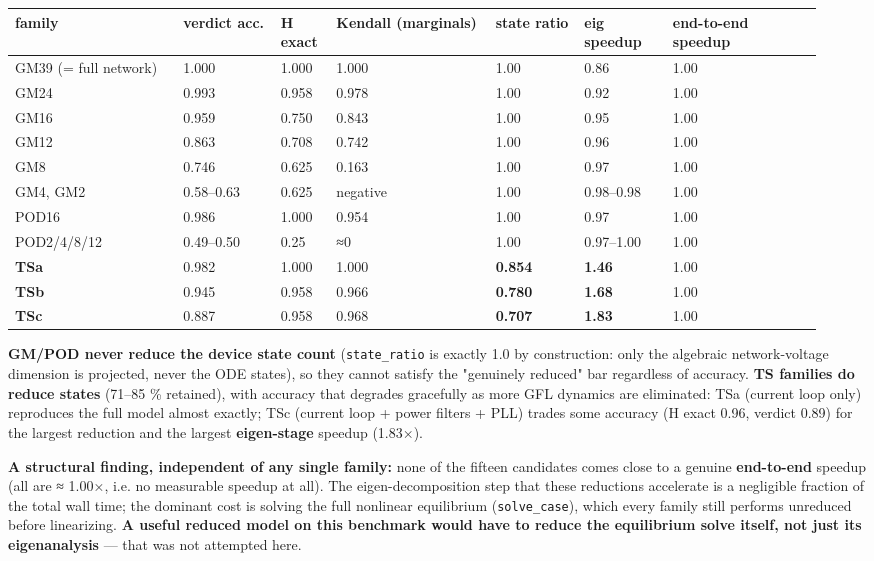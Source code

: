 \documentclass[10pt,a4paper]{article}
\begin{document}
{\small
\begin{longtable}{L{0.199\linewidth}L{0.114\linewidth}L{0.066\linewidth}L{0.180\linewidth}L{0.104\linewidth}L{0.104\linewidth}L{0.171\linewidth}}
\toprule
\textbf{family} & \textbf{verdict acc.} & \textbf{H exact} & \textbf{Kendall (marginals)} & \textbf{state ratio} & \textbf{eig speedup} & \textbf{end-to-end speedup} \\
\midrule
\endhead
GM39 (= full network) & 1.000 & 1.000 & 1.000 & 1.00 & 0.86 & 1.00 \\
GM24 & 0.993 & 0.958 & 0.978 & 1.00 & 0.92 & 1.00 \\
GM16 & 0.959 & 0.750 & 0.843 & 1.00 & 0.95 & 1.00 \\
GM12 & 0.863 & 0.708 & 0.742 & 1.00 & 0.96 & 1.00 \\
GM8 & 0.746 & 0.625 & 0.163 & 1.00 & 0.97 & 1.00 \\
GM4, GM2 & 0.58–0.63 & 0.625 & negative & 1.00 & 0.98–0.98 & 1.00 \\
POD16 & 0.986 & 1.000 & 0.954 & 1.00 & 0.97 & 1.00 \\
POD2/4/8/12 & 0.49–0.50 & 0.25 & ≈0 & 1.00 & 0.97–1.00 & 1.00 \\
\textbf{TSa} & 0.982 & 1.000 & 1.000 & \textbf{0.854} & \textbf{1.46} & 1.00 \\
\textbf{TSb} & 0.945 & 0.958 & 0.966 & \textbf{0.780} & \textbf{1.68} & 1.00 \\
\textbf{TSc} & 0.887 & 0.958 & 0.968 & \textbf{0.707} & \textbf{1.83} & 1.00 \\
\bottomrule
\end{longtable}}
\textbf{GM/POD never reduce the device state count} (\texttt{state\_\allowbreak{}ratio} is exactly 1.0 by construction: only the algebraic network-voltage dimension is projected, never the ODE states), so they cannot satisfy the "genuinely reduced" bar regardless of accuracy. \textbf{TS families do reduce states} (71–85 \% retained), with accuracy that degrades gracefully as more GFL dynamics are eliminated: TSa (current loop only) reproduces the full model almost exactly; TSc (current loop + power filters + PLL) trades some accuracy (H exact 0.96, verdict 0.89) for the largest reduction and the largest \textbf{eigen-stage} speedup (1.83×).

\textbf{A structural finding, independent of any single family:} none of the fifteen candidates comes close to a genuine \textbf{end-to-end} speedup (all are ≈ 1.00×, i.e. no measurable speedup at all). The eigen-decomposition step that these reductions accelerate is a negligible fraction of the total wall time; the dominant cost is solving the full nonlinear equilibrium (\texttt{solve\_\allowbreak{}case}), which every family still performs unreduced before linearizing. \textbf{A useful reduced model on this benchmark would have to reduce the equilibrium solve itself, not just its eigenanalysis} — that was not attempted here.
\end{document}
